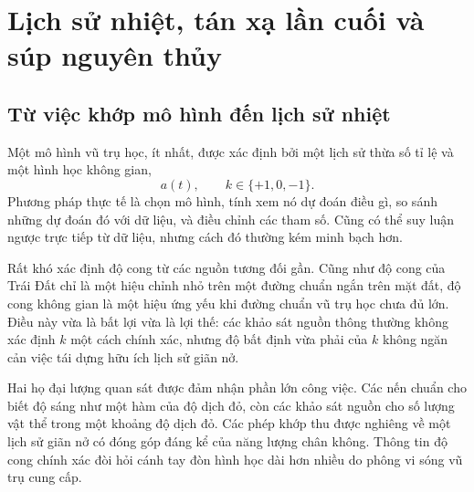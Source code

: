 \chapter{Lịch sử nhiệt, tán xạ lần cuối và súp nguyên thủy}


\section{Từ việc khớp mô hình đến lịch sử nhiệt}

Một mô hình vũ trụ học, ít nhất, được xác định bởi một lịch sử thừa số tỉ lệ và một hình học không gian,
\begin{equation}
a(t),
\qquad
k\in\{+1,0,-1\}.
\end{equation}
Phương pháp thực tế là chọn mô hình, tính xem nó dự đoán điều gì, so sánh những dự đoán đó với dữ liệu, và điều chỉnh các tham số. Cũng có thể suy luận ngược trực tiếp từ dữ liệu, nhưng cách đó thường kém minh bạch hơn.

Rất khó xác định độ cong từ các nguồn tương đối gần. Cũng như độ cong của Trái Đất chỉ là một hiệu chỉnh nhỏ trên một đường chuẩn ngắn trên mặt đất, độ cong không gian là một hiệu ứng yếu khi đường chuẩn vũ trụ học chưa đủ lớn. Điều này vừa là bất lợi vừa là lợi thế: các khảo sát nguồn thông thường không xác định \(k\) một cách chính xác, nhưng độ bất định vừa phải của \(k\) không ngăn cản việc tái dựng hữu ích lịch sử giãn nở.

Hai họ đại lượng quan sát được đảm nhận phần lớn công việc. Các nến chuẩn cho biết độ sáng như một hàm của độ dịch đỏ, còn các khảo sát nguồn cho số lượng vật thể trong một khoảng độ dịch đỏ. Các phép khớp thu được nghiêng về một lịch sử giãn nở có đóng góp đáng kể của năng lượng chân không. Thông tin độ cong chính xác đòi hỏi cánh tay đòn hình học dài hơn nhiều do phông vi sóng vũ trụ cung cấp.

